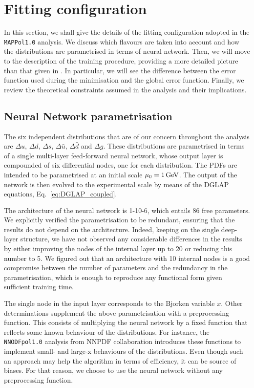 \section{Fitting configuration}
\label{sec:4.3}
In this section, we shall give the details of the fitting configuration adopted in the \texttt{MAPPol1.0} analysis. We discuss which flavours are taken into account and how the distributions are parametrised in terms of neural network. Then, we will move to the description of the training procedure, providing a more detailed picture than that given in . In particular, we will see the difference between the error function used during the minimisation and the global error function. Finally, we review the theoretical constraints assumed in the analysis and their implications.

\subsection*{Neural Network parametrisation}
The six independent distributions that are of our concern throughout the analysis are $\Delta u, \, \Delta d, \, \Delta s, \, \Delta \bar{u}, \, \Delta \bar{d}$ and $\Delta g$. These distributions are parametrised in terms of a single multi-layer feed-forward neural network, whose output layer is compounded of six differential nodes, one for each distribution. The PDFs are intended to be parametrised at an initial scale $\mu_0 = 1 \, \textrm{GeV}$. The output of the network is then evolved to the experimental scale by means of the DGLAP equations, Eq.~\eqref{eq:DGLAP_coupled}.%

The architecture of the neural network is 1-10-6, which entails 86 free parameters. We explicitly verified the parametrisation to be redundant, ensuring that the results do not depend on the architecture. Indeed, keeping on the single deep-layer structure, we have not observed any considerable differences in the results by either improving the nodes of the internal layer up to 20 or reducing this number to 5. We figured out that an architecture with 10 internal nodes is a good compromise between the number of parameters and the redundancy in the parametrisation, which is enough to reproduce any functional form given sufficient training time.%

The single node in the input layer corresponds to the Bjorken variable $x$. Other determinations supplement the above parametrisation with a preprocessing function. This consists of multiplying the neural network by a fixed function that reflects some known behaviour of the distributions. For instance, the \texttt{NNODFpol1.0} analysis from NNPDF collaboration \cite{Nocera:2014gqa} introduces these functions to implement small- and large-x behaviours of the distributions. Even though such an approach may help the algorithm in terms of efficiency, it can be source of biases. For that reason, we choose to use the neural network without any preprocessing function.%

